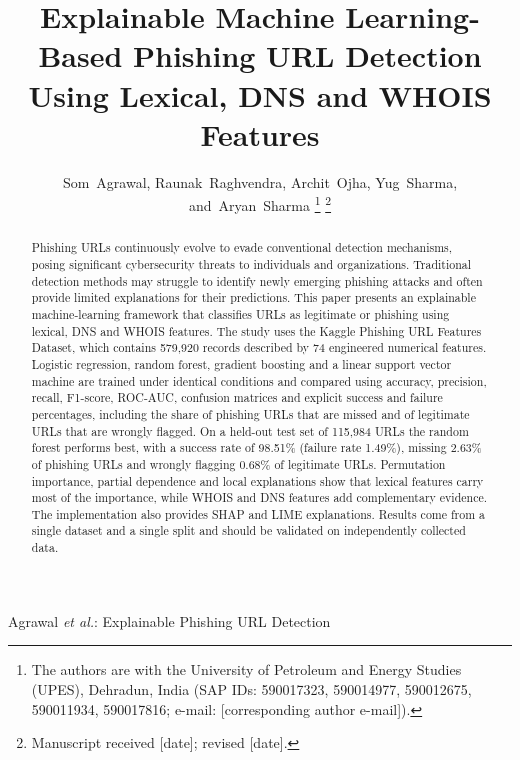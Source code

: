 \documentclass[journal]{IEEEtran}
\begin{document}
\title{Explainable Machine Learning-Based Phishing URL Detection Using Lexical, DNS and WHOIS Features}

\author{Som~Agrawal,
        Raunak~Raghvendra,
        Archit~Ojha,
        Yug~Sharma,
        and~Aryan~Sharma%
\thanks{The authors are with the University of Petroleum and Energy Studies (UPES), Dehradun, India (SAP IDs: 590017323, 590014977, 590012675, 590011934, 590017816; e-mail: [corresponding author e-mail]).}%
\thanks{Manuscript received [date]; revised [date].}}

%
{Agrawal \MakeLowercase{\textit{et al.}}: Explainable Phishing URL Detection}

\maketitle

\begin{abstract}
Phishing URLs continuously evolve to evade conventional detection mechanisms, posing significant cybersecurity threats to individuals and organizations. Traditional detection methods may struggle to identify newly emerging phishing attacks and often provide limited explanations for their predictions. This paper presents an explainable machine-learning framework that classifies URLs as legitimate or phishing using lexical, DNS and WHOIS features. The study uses the Kaggle Phishing URL Features Dataset, which contains 579,920 records described by 74 engineered numerical features. Logistic regression, random forest, gradient boosting and a linear support vector machine are trained under identical conditions and compared using accuracy, precision, recall, F1-score, ROC-AUC, confusion matrices and explicit success and failure percentages, including the share of phishing URLs that are missed and of legitimate URLs that are wrongly flagged. On a held-out test set of 115,984 URLs the random forest performs best, with a success rate of 98.51\% (failure rate 1.49\%), missing 2.63\% of phishing URLs and wrongly flagging 0.68\% of legitimate URLs. Permutation importance, partial dependence and local explanations show that lexical features carry most of the importance, while WHOIS and DNS features add complementary evidence. The implementation also provides SHAP and LIME explanations. Results come from a single dataset and a single split and should be validated on independently collected data.
\end{abstract}
\end{document}

